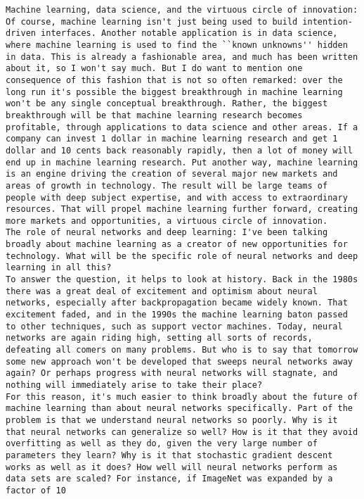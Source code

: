 \begin{lstlisting}
Machine learning, data science, and the virtuous circle of innovation: Of course, machine learning isn't just being used to build intention-driven interfaces. Another notable application is in data science, where machine learning is used to find the ``known unknowns'' hidden in data. This is already a fashionable area, and much has been written about it, so I won't say much. But I do want to mention one consequence of this fashion that is not so often remarked: over the long run it's possible the biggest breakthrough in machine learning won't be any single conceptual breakthrough. Rather, the biggest breakthrough will be that machine learning research becomes profitable, through applications to data science and other areas. If a company can invest 1 dollar in machine learning research and get 1 dollar and 10 cents back reasonably rapidly, then a lot of money will end up in machine learning research. Put another way, machine learning is an engine driving the creation of several major new markets and areas of growth in technology. The result will be large teams of people with deep subject expertise, and with access to extraordinary resources. That will propel machine learning further forward, creating more markets and opportunities, a virtuous circle of innovation.
The role of neural networks and deep learning: I've been talking broadly about machine learning as a creator of new opportunities for technology. What will be the specific role of neural networks and deep learning in all this?
To answer the question, it helps to look at history. Back in the 1980s there was a great deal of excitement and optimism about neural networks, especially after backpropagation became widely known. That excitement faded, and in the 1990s the machine learning baton passed to other techniques, such as support vector machines. Today, neural networks are again riding high, setting all sorts of records, defeating all comers on many problems. But who is to say that tomorrow some new approach won't be developed that sweeps neural networks away again? Or perhaps progress with neural networks will stagnate, and nothing will immediately arise to take their place?
For this reason, it's much easier to think broadly about the future of machine learning than about neural networks specifically. Part of the problem is that we understand neural networks so poorly. Why is it that neural networks can generalize so well? How is it that they avoid overfitting as well as they do, given the very large number of parameters they learn? Why is it that stochastic gradient descent works as well as it does? How well will neural networks perform as data sets are scaled? For instance, if ImageNet was expanded by a factor of 10

\end{lstlisting}
